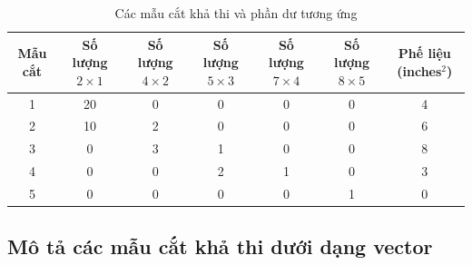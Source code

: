 \documentclass[a4paper]{article}
\begin{document}
\begin{table}[h!]
    \centering
    \begin{tabular}{|c|c|c|c|c|c|c|}
    \hline
    \textbf{Mẫu cắt} & \makecell{\textbf{Số lượng} \\ \textbf{\( 2 \times 1 \)}} & \makecell{\textbf{Số lượng} \\ \textbf{\( 4 \times 2 \)}} & \makecell{\textbf{Số lượng} \\ \textbf{\( 5 \times 3 \)}} & \makecell{\textbf{Số lượng} \\ \textbf{\( 7 \times 4 \)}} & \makecell{\textbf{Số lượng} \\ \textbf{\( 8 \times 5 \)}} & \makecell{\textbf{Phế liệu} \\ \textbf{(inches\(^2\))}} \\ \hline
    1                & 20                               & 0                                & 0                                & 0                                & 0                                & 4                                 \\ \hline
    2                & 10                               & 2                                & 0                                & 0                                & 0                                & 6                                 \\ \hline
    3                & 0                                & 3                                & 1                                & 0                                & 0                                & 8                                 \\ \hline
    4                & 0                                & 0                                & 2                                & 1                                & 0                                & 3                                 \\ \hline
    5                & 0                                & 0                                & 0                                & 0                                & 1                                & 0                                 \\ \hline
    \end{tabular}
    \caption{Các mẫu cắt khả thi và phần dư tương ứng}
    \label{table:cutting_patterns}
\end{table}
\subsection{Mô tả các mẫu cắt khả thi dưới dạng vector}
\end{document}
